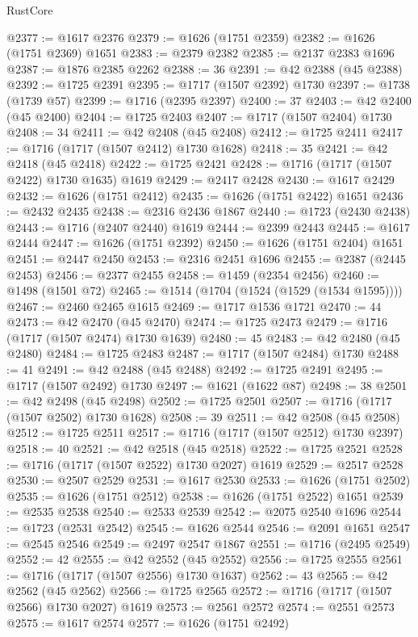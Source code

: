 \begin{lexlean}{RustCore}
\begin{coremodule}
@2377 := @1617 @2376
@2379 := @1626 (@1751 @2359)
@2382 := @1626 (@1751 @2369) @1651
@2383 := @2379 @2382
@2385 := @2137 @2383 @1696
@2387 := @1876 @2385 @2262
@2388 := 36
@2391 := @42 @2388 (@45 @2388)
@2392 := @1725 @2391
@2395 := @1717 (@1507 @2392) @1730
@2397 := @1738 (@1739 @57)
@2399 := @1716 (@2395 @2397)
@2400 := 37
@2403 := @42 @2400 (@45 @2400)
@2404 := @1725 @2403
@2407 := @1717 (@1507 @2404) @1730
@2408 := 34
@2411 := @42 @2408 (@45 @2408)
@2412 := @1725 @2411
@2417 := @1716 (@1717 (@1507 @2412) @1730 @1628)
@2418 := 35
@2421 := @42 @2418 (@45 @2418)
@2422 := @1725 @2421
@2428 := @1716 (@1717 (@1507 @2422) @1730 @1635) @1619
@2429 := @2417 @2428
@2430 := @1617 @2429
@2432 := @1626 (@1751 @2412)
@2435 := @1626 (@1751 @2422) @1651
@2436 := @2432 @2435
@2438 := @2316 @2436 @1867
@2440 := @1723 (@2430 @2438)
@2443 := @1716 (@2407 @2440) @1619
@2444 := @2399 @2443
@2445 := @1617 @2444
@2447 := @1626 (@1751 @2392)
@2450 := @1626 (@1751 @2404) @1651
@2451 := @2447 @2450
@2453 := @2316 @2451 @1696
@2455 := @2387 (@2445 @2453)
@2456 := @2377 @2455
@2458 := @1459 (@2354 @2456)
@2460 := @1498 (@1501 @72)
@2465 := @1514 (@1704 (@1524 (@1529 (@1534 @1595))))
@2467 := @2460 @2465 @1615
@2469 := @1717 @1536 @1721
@2470 := 44
@2473 := @42 @2470 (@45 @2470)
@2474 := @1725 @2473
@2479 := @1716 (@1717 (@1507 @2474) @1730 @1639)
@2480 := 45
@2483 := @42 @2480 (@45 @2480)
@2484 := @1725 @2483
@2487 := @1717 (@1507 @2484) @1730
@2488 := 41
@2491 := @42 @2488 (@45 @2488)
@2492 := @1725 @2491
@2495 := @1717 (@1507 @2492) @1730
@2497 := @1621 (@1622 @87)
@2498 := 38
@2501 := @42 @2498 (@45 @2498)
@2502 := @1725 @2501
@2507 := @1716 (@1717 (@1507 @2502) @1730 @1628)
@2508 := 39
@2511 := @42 @2508 (@45 @2508)
@2512 := @1725 @2511
@2517 := @1716 (@1717 (@1507 @2512) @1730 @2397)
@2518 := 40
@2521 := @42 @2518 (@45 @2518)
@2522 := @1725 @2521
@2528 := @1716 (@1717 (@1507 @2522) @1730 @2027) @1619
@2529 := @2517 @2528
@2530 := @2507 @2529
@2531 := @1617 @2530
@2533 := @1626 (@1751 @2502)
@2535 := @1626 (@1751 @2512)
@2538 := @1626 (@1751 @2522) @1651
@2539 := @2535 @2538
@2540 := @2533 @2539
@2542 := @2075 @2540 @1696
@2544 := @1723 (@2531 @2542)
@2545 := @1626 @2544
@2546 := @2091 @1651
@2547 := @2545 @2546
@2549 := @2497 @2547 @1867
@2551 := @1716 (@2495 @2549)
@2552 := 42
@2555 := @42 @2552 (@45 @2552)
@2556 := @1725 @2555
@2561 := @1716 (@1717 (@1507 @2556) @1730 @1637)
@2562 := 43
@2565 := @42 @2562 (@45 @2562)
@2566 := @1725 @2565
@2572 := @1716 (@1717 (@1507 @2566) @1730 @2027) @1619
@2573 := @2561 @2572
@2574 := @2551 @2573
@2575 := @1617 @2574
@2577 := @1626 (@1751 @2492)

\end{coremodule}
\end{lexlean}
